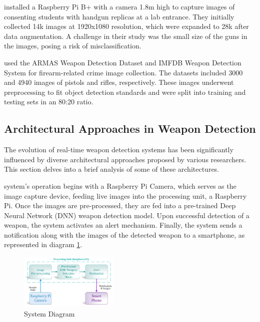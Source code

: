 \citet{rfc19} installed a Raspberry Pi B+ with a camera 1.8m high to capture images of consenting students with handgun replicas at a lab entrance. They initially collected 14k images at 1920x1080 resolution, which were expanded to 28k after data augmentation. A challenge in their study was the small size of the guns in the images, posing a risk of misclassification.

\citet{rfc20} used the ARMAS Weapon Detection Dataset and IMFDB Weapon Detection System \cite{rfc28} for firearm-related crime image collection. The datasets included 3000 and 4940 images of pistols and rifles, respectively. These images underwent preprocessing to fit object detection standards and were split into training and testing sets in an 80:20 ratio.

\subsection{Architectural Approaches in Weapon Detection}
The evolution of real-time weapon detection systems has been significantly influenced by diverse architectural approaches proposed by various researchers. This section delves into a brief analysis of some of these architectures.

\citet{rfc19} system's operation begins with a Raspberry Pi Camera, which serves as the image capture device, feeding live images into the processing unit, a Raspberry Pi. Once the images are pre-processed, they are fed into a pre-trained Deep Neural Network (DNN) weapon detection model. Upon successful detection of a weapon, the system activates an alert mechanism. Finally, the system sends a notification along with the images of the detected weapon to a smartphone,
as represented in diagram \ref{fig:uob-architecture}.

\begin{figure}[h]
    \centering 
    \includegraphics[width=0.42\textwidth]{figs/uob-architecture.png} 
    \caption{\citet{rfc19} System Diagram}
    \label{fig:uob-architecture}
\end{figure}


